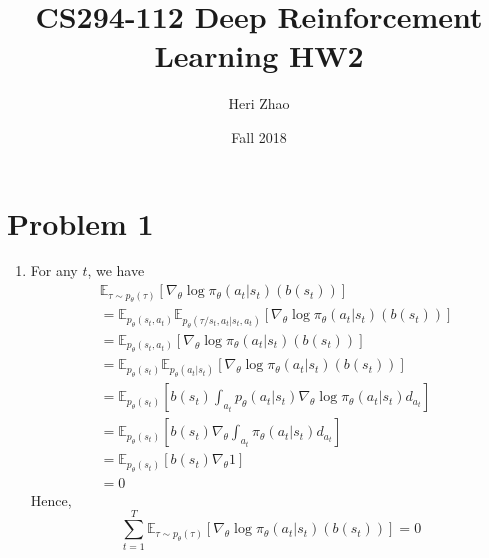 \documentclass[12pt]{article}
\title{CS294-112 Deep Reinforcement Learning HW2}
\author{ Heri Zhao
}
\date{Fall 2018}
\begin{document}
\maketitle

\section*{Problem 1}
\begin{enumerate}[label=(\alph*)]
  \item For any $t$, we have
  \begin{align*}
    & \mathbb{E}_{\tau \sim p_\theta(\tau)} \left[ \nabla_\theta \log \pi_\theta(a_t|s_t) \left(b(s_t)\right)\right] \\
    &= \mathbb{E}_{p_\theta(s_t, a_t)} \mathbb{E}_{p_\theta(\tau / s_t, a_t | s_t, a_t)} \left[ \nabla_\theta \log \pi_\theta(a_t|s_t) \left(b(s_t)\right)\right] \\
    &= \mathbb{E}_{p_\theta(s_t, a_t)} \left[ \nabla_\theta \log \pi_\theta(a_t|s_t) \left(b(s_t)\right)\right] \\
    &= \mathbb{E}_{p_\theta(s_t)} \mathbb{E}_{p_\theta(a_t | s_t)} \left[ \nabla_\theta \log \pi_\theta(a_t|s_t) \left(b(s_t)\right)\right] \\
    &= \mathbb{E}_{p_\theta(s_t)} \left[b(s_t) \int_{a_t} p_\theta(a_t | s_t) \nabla_\theta \log \pi_\theta(a_t|s_t) d_{a_t} \right] \\
    &= \mathbb{E}_{p_\theta(s_t)} \left[b(s_t)\nabla_\theta \int_{a_t} \pi_\theta(a_t|s_t) d_{a_t} \right] \\
    &= \mathbb{E}_{p_\theta(s_t)} \left[b(s_t)\nabla_\theta 1 \right] \\
    &= 0
  \end{align*}
  Hence,
  $$
  \sum_{t=1}^T \mathbb{E}_{\tau \sim p_\theta(\tau)}\left[ \nabla_\theta \log \pi_\theta(a_t|s_t) \left(b(s_t)\right)\right] = 0
  $$


\end{enumerate}
\end{document}

